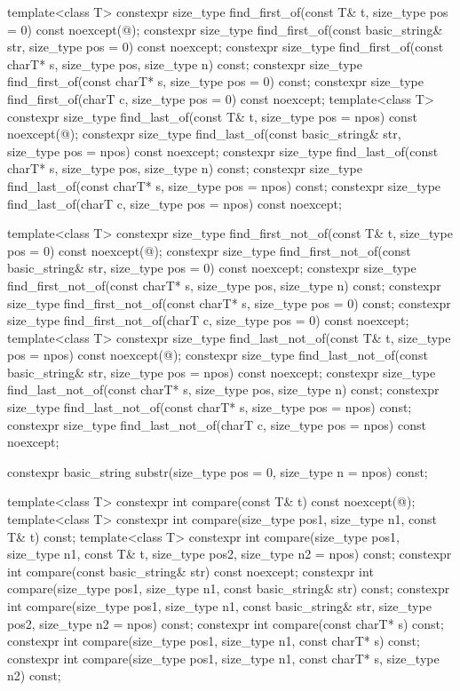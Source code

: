 \begin{codeblock}
{{    template<class T>
      constexpr size_type find_first_of(const T& t, size_type pos = 0) const noexcept(@\seebelow@);
    constexpr size_type find_first_of(const basic_string& str, size_type pos = 0) const noexcept;
    constexpr size_type find_first_of(const charT* s, size_type pos, size_type n) const;
    constexpr size_type find_first_of(const charT* s, size_type pos = 0) const;
    constexpr size_type find_first_of(charT c, size_type pos = 0) const noexcept;
    template<class T>
      constexpr size_type find_last_of(const T& t,
                                       size_type pos = npos) const noexcept(@\seebelow@);
    constexpr size_type find_last_of(const basic_string& str,
                                     size_type pos = npos) const noexcept;
    constexpr size_type find_last_of(const charT* s, size_type pos, size_type n) const;
    constexpr size_type find_last_of(const charT* s, size_type pos = npos) const;
    constexpr size_type find_last_of(charT c, size_type pos = npos) const noexcept;

    template<class T>
      constexpr size_type find_first_not_of(const T& t,
                                            size_type pos = 0) const noexcept(@\seebelow@);
    constexpr size_type find_first_not_of(const basic_string& str,
                                          size_type pos = 0) const noexcept;
    constexpr size_type find_first_not_of(const charT* s, size_type pos, size_type n) const;
    constexpr size_type find_first_not_of(const charT* s, size_type pos = 0) const;
    constexpr size_type find_first_not_of(charT c, size_type pos = 0) const noexcept;
    template<class T>
      constexpr size_type find_last_not_of(const T& t,
                                           size_type pos = npos) const noexcept(@\seebelow@);
    constexpr size_type find_last_not_of(const basic_string& str,
                                         size_type pos = npos) const noexcept;
    constexpr size_type find_last_not_of(const charT* s, size_type pos, size_type n) const;
    constexpr size_type find_last_not_of(const charT* s, size_type pos = npos) const;
    constexpr size_type find_last_not_of(charT c, size_type pos = npos) const noexcept;

    constexpr basic_string substr(size_type pos = 0, size_type n = npos) const;

    template<class T>
      constexpr int compare(const T& t) const noexcept(@\seebelow@);
    template<class T>
      constexpr int compare(size_type pos1, size_type n1, const T& t) const;
    template<class T>
      constexpr int compare(size_type pos1, size_type n1, const T& t,
                            size_type pos2, size_type n2 = npos) const;
    constexpr int compare(const basic_string& str) const noexcept;
    constexpr int compare(size_type pos1, size_type n1, const basic_string& str) const;
    constexpr int compare(size_type pos1, size_type n1, const basic_string& str,
                          size_type pos2, size_type n2 = npos) const;
    constexpr int compare(const charT* s) const;
    constexpr int compare(size_type pos1, size_type n1, const charT* s) const;
    constexpr int compare(size_type pos1, size_type n1, const charT* s, size_type n2) const;

}}
\end{codeblock}
